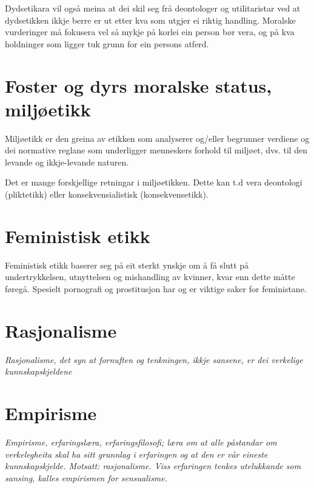 \documentclass[a4paper]{IEEEtran}
\begin{document}
Dydsetikara vil også meina at dei skil seg frå deontologer og utilitaristar ved at dydsetikken ikkje berre er ut etter kva som utgjer ei riktig handling. Moralske vurderinger må fokusera vel så mykje på korlei ein person bør vera, og på kva holdninger som ligger tuk grunn for ein persons atferd. \bigskip

\section{Foster og dyrs moralske status, miljøetikk}
\label{fdms}\bigskip

Miljøetikk er den greina av etikken som analyserer og/eller begrunner verdiene og dei normative reglane som underligger menneskers forhold til miljøet, dvs. til den levande og ikkje-levande naturen.\bigskip

Det er mange forskjellige retningar i miljøetikken. Dette kan t.d vera deontologi (pliktetikk) eller konsekvensialistisk (konsekvensetikk). 

\section{Feministisk etikk}
\label{femimisme}\bigskip

Feministisk etikk baserer seg på eit sterkt ynskje om å få slutt på undertrykkelsen, utnyttelsen og mishandling av kvinner, kvar enn dette måtte føregå. Spesielt pornografi og prostitusjon har og er viktige saker for feministane. 

\section{Rasjonalisme}
\label{rasjonalisme}\bigskip

\textit{Rasjonalisme, det syn at fornuften og tenkningen, ikkje sansene, er dei verkelige kunnskapskjeldene}

\section{Empirisme}
\label{empirisme}\bigskip

\textit{Empirisme, erfaringslæra, erfaringsfilosofi; læra om at alle påstandar om verkelegheita skal ha sitt grunnlag i erfaringen og at den er vår eineste kunnskapskjelde. Motsatt: rasjonalisme. Viss erfaringen tenkes utelukkande som sansing, kalles empirismen for sensualisme.}
\end{document}
